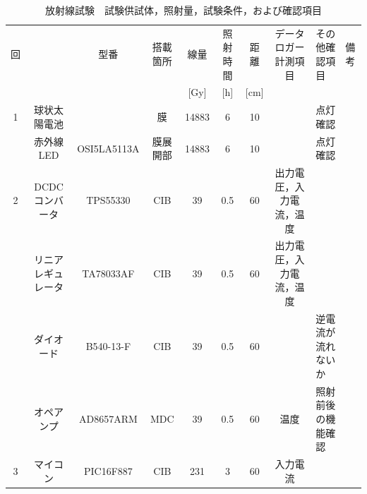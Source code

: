 \begin{landscape}
\begin{table}[htbp]
	\centering
	\caption{放射線試験　試験供試体，照射量，試験条件，および確認項目}
	\label{tab:tidic}
	
	\scriptsize
	\begin{tabular}{c|c|c|c|c|c|c|c|l|l}
		\hline\hline
		回                   &                      & 型番                   & 搭載箇所                 & 線量       & 照射時間         & 距離           & データロガー計測項目           & その他確認項目                 & 備考                    \\
		                   &                      &                  &                 & {[}Gy{]}        &  {[}h{]}         & {[}cm{]}          &           &                &                  \\ \hline
		1   & 球状太陽電池               &                      & 膜                    & 14883                & 6                    & 10                   &                      & 点灯確認                 &                       \\
		& 赤外線LED               & OSI5LA5113A          & 膜展開部                 & 14883                & 6                    & 10                   &                      & 点灯確認                 &                       \\\hline
		2   & DCDCコンバータ            & TPS55330             & CIB                  & 39                   & 0.5                  & 60                   & 出力電圧，入力電流，温度         &         &                       \\
		& リニアレギュレータ            & TA78033AF         & CIB                  & 39                   & 0.5                  & 60                   & 出力電圧，入力電流，温度         &         &                       \\
		& ダイオード                & B540-13-F            & CIB                  & 39                   & 0.5                  & 60                   &                      & 逆電流が流れないか            &                       \\
		& オペアンプ                & AD8657ARM            & MDC                  & 39                   & 0.5                  & 60                   & 温度                   & 照射前後の機能確認         &                       \\\hline
		3  & マイコン                 & PIC16F887            & CIB                  & 231                  & 3                    & 60                   & 入力電流                 &                      &                       \\

\end{tabular}
\end{table}
\end{landscape}
